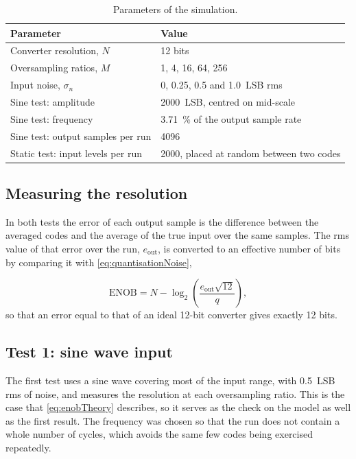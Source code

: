 \begin{table}[htbp]
\centering
\begin{tabularx}{0.9\textwidth}{@{} X l @{}}
\toprule
\textbf{Parameter} & \textbf{Value} \\
\midrule
Converter resolution, $N$                 & 12 bits \\
Oversampling ratios, $M$                  & 1, 4, 16, 64, 256 \\
Input noise, $\sigma_n$                   & 0, 0.25, 0.5 and \qty{1.0}{LSB} rms \\
Sine test: amplitude                      & \qty{2000}{LSB}, centred on mid-scale \\
Sine test: frequency                      & \qty{3.71}{\percent} of the output sample rate \\
Sine test: output samples per run         & 4096 \\
Static test: input levels per run         & 2000, placed at random between two codes \\
\bottomrule
\end{tabularx}
\caption{Parameters of the simulation.}
\label{tab:parameters}
\end{table}

\subsection{Measuring the resolution}

In both tests the error of each output sample is the difference between the
averaged codes and the average of the true input over the same samples. The
rms value of that error over the run, $e_{\mathrm{out}}$, is converted to an
effective number of bits by comparing it with \cref{eq:quantisationNoise},

\begin{equation}
  \label{eq:enobMeasured}
  \mathrm{ENOB} = N - \log_2\!\left(\frac{e_{\mathrm{out}}\sqrt{12}}{q}\right),
\end{equation}
so that an error equal to that of an ideal 12-bit converter gives exactly 12
bits.

\subsection{Test 1: sine wave input}

The first test uses a sine wave covering most of the input range, with
\qty{0.5}{LSB} rms of noise, and measures the resolution at each oversampling
ratio. This is the case that \cref{eq:enobTheory} describes, so it serves as
the check on the model as well as the first result. The frequency was chosen
so that the run does not contain a whole number of cycles, which avoids the
same few codes being exercised repeatedly.

